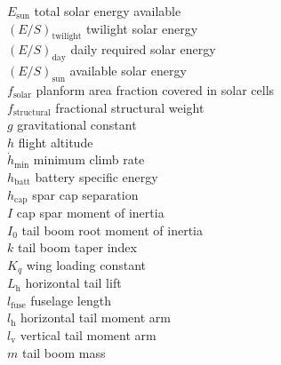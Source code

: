 \begin{tabbing}
$E_{\text{sun}}$ \> total solar energy available \\ %
$(E/S)_{\text{twilight}}$ \> twilight solar energy \\ %
$(E/S)_{\text{day}}$ \> daily required solar energy \\ %
$(E/S)_{\text{sun}}$ \> available solar energy \\ %
$f_{\text{solar}}$ \> planform area fraction covered in solar cells \\
$f_{\text{structural}}$ \> fractional structural weight\\
$g$ \> gravitational constant \\ %
$h$ \> flight altitude \\ %
$\dot{h}_{\text{min}}$ \> minimum climb rate \\ %
$h_{\text{batt}}$ \> battery specific energy \\ %
$h_{\text{cap}}$ \> spar cap separation \\ %
$I$ \> cap spar moment of inertia \\ %
$I_0$ \> tail boom root moment of inertia \\ %
$k$ \> tail boom taper index \\
$K_q$ \> wing loading constant \\ %
$L_\text{h}$ \> horizontal tail lift \\ %
$l_\text{fuse}$ \> fuselage length \\ %
$l_\text{h}$ \> horizontal tail moment arm \\ %
$l_\text{v}$ \> vertical tail moment arm \\ %
$m$ \> tail boom mass \\ %

\end{tabbing}
